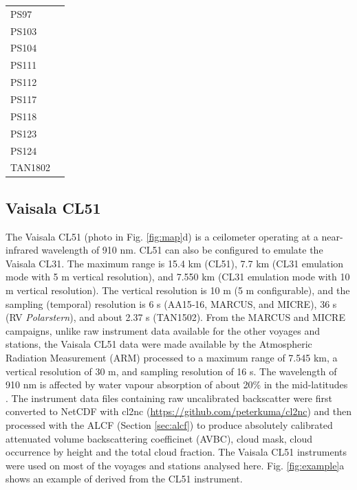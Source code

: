 \documentclass[12pt,a4paper]{article}
\begin{document}
\begin{table}[t!]
\begin{tabular}{lp{14.5cm}}
PS97     & \cite{kniglanglo2016f,kniglanglo2016g,kniglanglo2016h,kniglanglo2016i,lamy2017} \\
PS103    & \cite{kniglanglo2017a,kniglanglo2017b,kniglanglo2017c,kniglanglo2017d,boebel2018} \\
PS104    & \cite{kniglanglo2017e,kniglanglo2017f,kniglanglo2017g,gohl2018,schmithsen2021a} \\
PS111    & \cite{schmithsen2019a,schmithsen2020a,schmithsen2021b,schmithsen2021c,schrder2018} \\
PS112    & \cite{schmithsen2019b,schmithsen2020b,schmithsen2021d,schmithsen2021e,meyer2018} \\
PS117    & \cite{schmithsen2019c,schmithsen2020c,schmithsen2021f,schmithsen2021g,boebel2019} \\
PS118    & \cite{schmithsen2019d,schmithsen2020d,schmithsen2021h,schmithsen2021i,dorschel2019} \\
PS123    & \cite{schmithsen2021j,schmithsen2021m,schmithsen2021n,schmithsen2021k,hoppmann2023} \\
PS124    & \cite{schmithsen2021o,schmithsen2021q,schmithsen2021p,hoppmann2023} \\
TAN1802  & \cite{kremser2020,kremser2021} \\
\end{tabular}
\end{table}

\subsection{Vaisala CL51}
\label{sec:cl51}

The Vaisala CL51 (photo in Fig. \ref{fig:map}d) is a ceilometer operating at a
near-infrared wavelength of 910 nm. CL51 can also be configured to emulate the
Vaisala CL31. The maximum range is 15.4 km (CL51), 7.7 km (CL31 emulation mode
with 5 m vertical resolution), and 7.550 km (CL31 emulation mode with 10 m
vertical resolution). The vertical resolution is 10 m (5 m configurable), and
the sampling (temporal) resolution is 6 s (AA15‐16, MARCUS, and MICRE), 36 s
(RV \emph{Polarstern}), and about 2.37 s (TAN1502). From the MARCUS and MICRE
campaigns, unlike raw instrument data available for the other voyages and
stations, the Vaisala CL51 data were made available by the Atmospheric
Radiation Measurement (ARM) processed to a maximum range of 7.545 km, a
vertical resolution of 30 m, and sampling resolution of 16 s. The wavelength of
910 nm is affected by water vapour absorption of about 20\% in the
mid-latitudes \citep{wiegner2015,wiegner2019}.  The instrument data files
containing raw uncalibrated backscatter were first converted to NetCDF with
cl2nc (\url{https://github.com/peterkuma/cl2nc}) and then processed with the
ALCF (Section \ref{sec:alcf}) to produce absolutely calibrated attenuated
volume backscattering coefficinet (AVBC), cloud mask, cloud occurrence by
height and the total cloud fraction.  The Vaisala CL51 instruments were used on
most of the voyages and stations analysed here. Fig. \ref{fig:example}a shows
an example of derived from the CL51 instrument.
\end{document}
